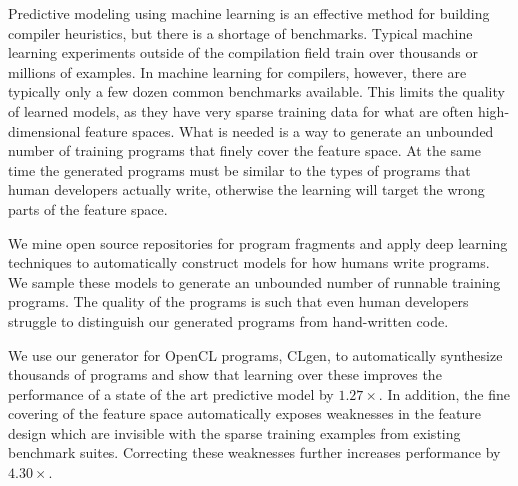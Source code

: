 Predictive modeling using machine learning is an effective method for building compiler heuristics, but there is a shortage of benchmarks. Typical machine learning experiments outside of the compilation field train over thousands or millions of examples. In machine learning for compilers, however, there are typically only a few dozen common benchmarks available. This limits the quality of learned models, as they have very sparse training data for what are often high-dimensional feature spaces. What is needed is a way to generate an unbounded number of training programs that finely cover the feature space. At the same time the generated programs must be similar to the types of programs that human developers actually write, otherwise the learning will target the wrong parts of the feature space.

We mine open source repositories for program fragments and apply deep learning techniques to automatically construct models for how humans write programs. We sample these models to generate an unbounded number of runnable training programs. The quality of the programs is such that even human developers struggle to distinguish our generated programs from hand-written code.

We use our generator for OpenCL programs, CLgen, to automatically synthesize thousands of programs and show that learning over these improves the performance of a state of the art predictive model by $1.27\times$. In addition, the fine covering of the feature space automatically exposes weaknesses in the feature design which are invisible with the sparse training examples from existing benchmark suites. Correcting these weaknesses further increases performance by $4.30\times$.
